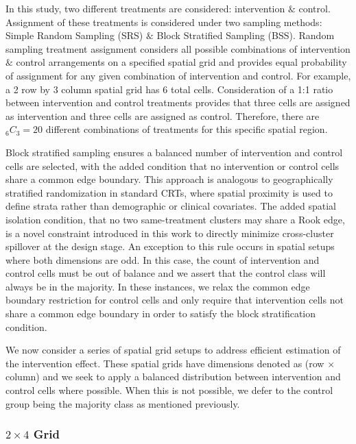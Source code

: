 \documentclass{article}[11pt]
\begin{document}
In this study, two different treatments are considered: intervention $\&$ control. Assignment of these treatments is considered under two sampling methods: Simple Random Sampling (SRS) $\&$ Block Stratified Sampling (BSS). Random sampling treatment assignment considers all possible combinations of intervention $\&$ control arrangements on a specified spatial grid and provides equal probability of assignment for any given combination of intervention and control. For example, a 2 row by 3 column spatial grid has 6 total cells. Consideration of a 1:1 ratio between intervention and control treatments provides that three cells are assigned as intervention and three cells are assigned as control. Therefore, there are %
$_{6}C_{3}=20$ different combinations of treatments for this specific spatial region. 

Block stratified sampling ensures a balanced number of intervention and control cells are selected, with the added condition that no intervention or control cells share a common edge boundary. This approach is analogous to geographically stratified randomization in standard CRTs, where spatial proximity is used to define strata rather than demographic or clinical covariates\cite{mccann_spatial_2018}\cite{crisp_covariate-constrained_2023}\cite{hayes_cluster_2017}. The added spatial isolation condition, that no two same-treatment clusters may share a Rook edge, is a novel constraint introduced in this work to directly minimize cross-cluster spillover at the design stage. An exception to this rule occurs in spatial setups where both dimensions are odd. In this case, the count of intervention and control cells must be out of balance and we assert that the control class will always be in the majority. In these instances, we relax the common edge boundary restriction for control cells and only require that intervention cells not share a common edge boundary in order to satisfy the block stratification condition.

We now consider a series of spatial grid setups to address efficient estimation of the intervention effect. These spatial grids have dimensions denoted as (row $\times$ column) and we seek to apply a balanced distribution between intervention and control cells where possible. When this is not possible, we defer to the control group being the majority class as mentioned previously.

\subsubsection{$2\times4$ Grid}
\end{document}
